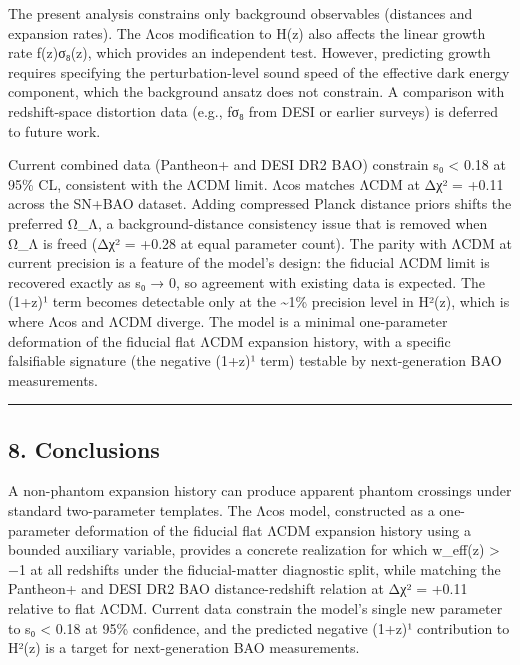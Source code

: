 The present analysis constrains only background observables (distances
and expansion rates). The Λcos modification to H(z) also affects the
linear growth rate f(z)σ₈(z), which provides an independent test.
However, predicting growth requires specifying the perturbation-level
sound speed of the effective dark energy component, which the background
ansatz does not constrain. A comparison with redshift-space distortion
data (e.g., fσ₈ from DESI or earlier surveys) is deferred to future
work.

Current combined data (Pantheon+ and DESI DR2 BAO) constrain s₀
\textless{} 0.18 at 95\% CL, consistent with the ΛCDM limit. Λcos
matches ΛCDM at Δχ² = +0.11 across the SN+BAO dataset. Adding compressed
Planck distance priors shifts the preferred Ω\_Λ, a background-distance
consistency issue that is removed when Ω\_Λ is freed (Δχ² = +0.28 at
equal parameter count). The parity with ΛCDM at current precision is a
feature of the model's design: the fiducial ΛCDM limit is recovered
exactly as s₀ → 0, so agreement with existing data is expected. The
(1+z)¹ term becomes detectable only at the \textasciitilde1\% precision
level in H²(z), which is where Λcos and ΛCDM diverge. The model is a
minimal one-parameter deformation of the fiducial flat ΛCDM expansion
history, with a specific falsifiable signature (the negative (1+z)¹
term) testable by next-generation BAO measurements.

\begin{center}\rule{0.5\linewidth}{0.5pt}\end{center}

\subsection{8. Conclusions}\label{conclusions}

A non-phantom expansion history can produce apparent phantom crossings
under standard two-parameter templates. The Λcos model, constructed as a
one-parameter deformation of the fiducial flat ΛCDM expansion history
using a bounded auxiliary variable, provides a concrete realization for
which w\_eff(z) \textgreater{} −1 at all redshifts under the
fiducial-matter diagnostic split, while matching the Pantheon+ and DESI
DR2 BAO distance-redshift relation at Δχ² = +0.11 relative to flat ΛCDM.
Current data constrain the model's single new parameter to s₀
\textless{} 0.18 at 95\% confidence, and the predicted negative (1+z)¹
contribution to H²(z) is a target for next-generation BAO measurements.

